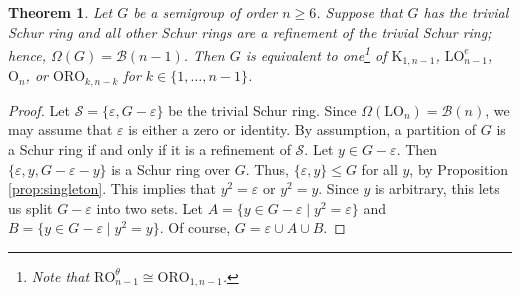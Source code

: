 \documentclass{article}
\theoremstyle{plain}
\newtheorem{Thm}{Theorem}[section]
\theoremstyle{definition}
\newcommand{\propref}[1]{Proposition \ref{#1}}
\renewcommand{\S}{\mathcal{S}}
\newcommand{\Q}{\mathbb{Q}}
\newcommand{\QS}{\Q[\S]}
\newcommand{\B}{\mathscr{B}}
\renewcommand{\O}{\mathrm{O}}
\newcommand{\K}{\mathrm{K}}
\newcommand{\LO}{\mathrm{LO}}
\newcommand{\RO}{\mathrm{RO}}
\newcommand{\ORO}{\mathrm{ORO}}
\begin{document}
\begin{Thm}\label{bnminus} Let $G$ be a semigroup of order $n\ge 6$. Suppose that $G$ has the trivial Schur ring and all other Schur rings are a refinement of the trivial Schur ring; hence, $\Omega(G) = \B(n-1)$. Then $G$ is equivalent to one\footnote{Note that $\RO_{n-1}^\theta \cong \ORO_{1,n-1}$.} of $\K_{1,n-1}$, $\LO_{n-1}^e$, $\O_n$, or $\ORO_{k,n-k}$ for $k\in\{1, \ldots, n-1\}$.
\end{Thm}
\begin{proof}
    Let $\S=\{\varepsilon, G-\varepsilon\}$ be the trivial Schur ring. Since $\Omega(\LO_n)=\B(n)$, we may assume that $\varepsilon$ is either a zero or identity. By assumption, a partition of $G$ is a Schur ring if and only if it is a refinement of $\S$. %
    Let $y\in G-\varepsilon$. Then $\{\varepsilon, y, G-\varepsilon-y\}$ is a Schur ring over $G$. Thus, $\{\varepsilon,y\}\le G$ for all $y$, by \propref{prop:singleton}. This implies that $y^2=\varepsilon$ or $y^2=y$. Since $y$ is arbitrary, this lets us split $G-\varepsilon$ into two sets. Let $A = \{y\in G-\varepsilon\mid y^2=\varepsilon\}$ and $B = \{y\in G-\varepsilon\mid y^2=y\}$. Of course, $G=\varepsilon\cup A\cup B$. %
    

\end{proof}
\end{document}
